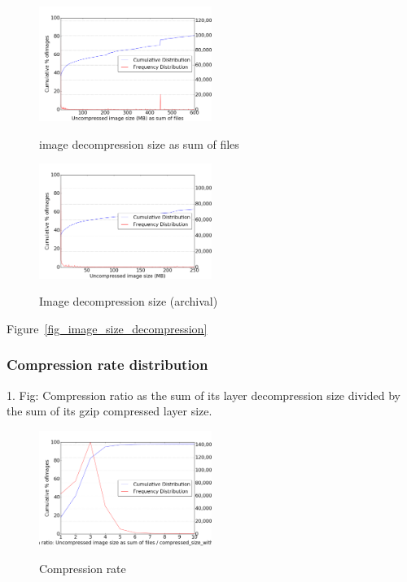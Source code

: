 \begin{figure}
	\centering
	\includegraphics[width=0.5\textwidth]{graphs/Uncompressed_image_size_(MB)_as_sum_of_files}\\
	\caption{image decompression size as sum of files}\label{fig_image_size_compression}
\end{figure}

\begin{figure}
	\centering
	\includegraphics[width=0.5\textwidth]{graphs/Uncompressed_image_size_(MB)}\\
	\caption{Image decompression size (archival)}\label{fig_image_size_compression}
\end{figure}

Figure~\ref{fig_image_size_decompression}

\subsubsection{Compression rate distribution}

1. Fig: Compression ratio as the sum of its layer decompression size divided by the sum of its gzip compressed layer size.

\begin{figure}
	\centering
	\includegraphics[width=0.5\textwidth]{graphs/Compression_ratio_Uncompressed_image_size_as_sum_of_files_divided_by_compressed_size_with_method_gzip}\\
	\caption{Compression rate}\label{fig_image_size_compression}
\end{figure}

